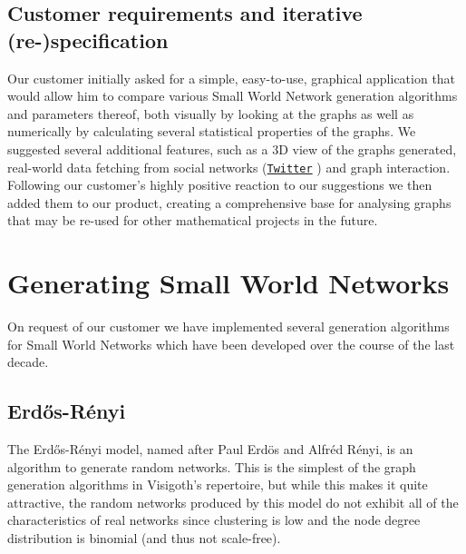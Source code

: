 \documentclass[a4paper,11pt,titlepage]{article}
\let\stdhref\href
\renewcommand{\href}[2]{\stdhref{#1}{\texttt{#2}}}
\let\stdsection\section         %
\renewcommand{\section}{\newpage\stdsection}
\newcommand{\Twitter}{\href{http://twitter.com}{Twitter} }
\begin{document}
\subsection{Customer requirements and iterative (re-)specification}

%
%

Our customer initially asked for a simple, easy-to-use, graphical
application that would allow him to compare various Small World
Network generation algorithms and parameters thereof, both visually
by looking at the graphs as well as numerically by calculating
several statistical properties of the graphs.
We suggested several additional features, such as a 3D view of the
graphs generated, real-world data fetching from social networks
(\Twitter) and graph interaction. Following our customer's highly
positive reaction to our suggestions we then added them to our
product, creating a comprehensive base for analysing graphs that
may be re-used for other mathematical projects in the future.




\section{Generating Small World Networks}
\label{sec:algos}

On request of our customer we have implemented several generation
algorithms for Small World Networks which have been developed over
the course of the last decade.


\subsection{Erd\H{o}s-R\'{e}nyi}
The Erd\H{o}s-R\'{e}nyi model, named after Paul Erd\"{o}s and
Alfr\'{e}d R\'{e}nyi, is an algorithm to generate random networks.
This is the simplest of the graph generation algorithms in Visigoth's
repertoire, but while this makes it quite attractive,
the random networks produced by this model do not exhibit all of
the characteristics of real networks since clustering is low and
the node degree distribution is binomial (and thus not scale-free).
\end{document}
